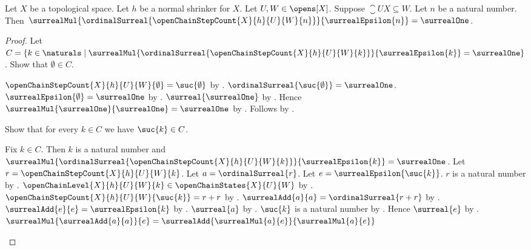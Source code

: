 \begin{theorem}\label{open_chain_mesh_identity}
    Let $X$ be a topological space.
    Let $h$ be a normal shrinker for $X$.
    Let $U,W\in\opens[X]$.
    Suppose $\closure{U}{X}\subseteq W$.
    Let $n$ be a natural number.
    Then
        $\surrealMul{
            \ordinalSurreal{\openChainStepCount{X}{h}{U}{W}{n}}}
            {\surrealEpsilon{n}}=\surrealOne$.
\end{theorem}
\begin{proof}
    Let $C=\{k\in\naturals\mid
        \surrealMul{
            \ordinalSurreal{\openChainStepCount{X}{h}{U}{W}{k}}}
            {\surrealEpsilon{k}}=\surrealOne\}$.
    Show that $\emptyset\in C$.
    \begin{subproof}
        $\openChainStepCount{X}{h}{U}{W}{\emptyset}
            =\suc{\emptyset}$
            by .
        $\ordinalSurreal{\suc{\emptyset}}=\surrealOne$.
        $\surrealEpsilon{\emptyset}=\surrealOne$
            by .
        $\surreal{\surrealOne}$ by .
        Hence $\surrealMul{\surrealOne}{\surrealOne}=\surrealOne$
            by .
        Follows by .
    \end{subproof}
    Show that for every $k\in C$ we have $\suc{k}\in C$.
    \begin{subproof}
        Fix $k\in C$.
        Then $k$ is a natural number and
            $\surrealMul{
                \ordinalSurreal{\openChainStepCount{X}{h}{U}{W}{k}}}
                {\surrealEpsilon{k}}=\surrealOne$.
        Let $r=\openChainStepCount{X}{h}{U}{W}{k}$.
        Let $a=\ordinalSurreal{r}$.
        Let $e=\surrealEpsilon{\suc{k}}$.
        $r$ is a natural number by .
        $\openChainLevel{X}{h}{U}{W}{k}
            \in\openChainStates{X}{U}{W}$
            by .
        $\openChainStepCount{X}{h}{U}{W}{\suc{k}}=r+r$
            by .
        $\surrealAdd{a}{a}=\ordinalSurreal{r+r}$
            by .
        $\surrealAdd{e}{e}=\surrealEpsilon{k}$
            by .
        $\surreal{a}$ by
            .
        $\suc{k}$ is a natural number by .
        Hence $\surreal{e}$ by .
        $\surrealMul{\surrealAdd{a}{a}}{e}
            =\surrealAdd{\surrealMul{a}{e}}{\surrealMul{a}{e}}$

\end{subproof}
\end{proof}
